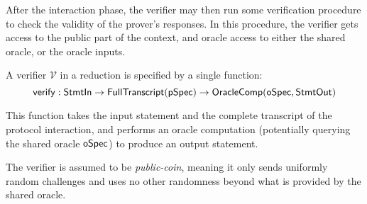
After the interaction phase, the verifier may then run some verification procedure to check the
validity of the prover's responses. In this procedure, the verifier gets access to the public part
of the context, and oracle access to either the shared oracle, or the oracle inputs.

\begin{definition}
    \label{def:verifier}
    A verifier $\mathcal{V}$ in a reduction is specified by a single function:
    \[ \mathsf{verify} : \mathsf{StmtIn} \to \mathsf{FullTranscript}(\mathsf{pSpec}) \to \mathsf{OracleComp}(\mathsf{oSpec}, \mathsf{StmtOut}) \]

    This function takes the input statement and the complete transcript of the protocol interaction, and performs an oracle computation (potentially querying the shared oracle $\mathsf{oSpec}$) to produce an output statement.

    The verifier is assumed to be \emph{public-coin}, meaning it only sends uniformly random challenges and uses no other randomness beyond what is provided by the shared oracle.
\end{definition}


